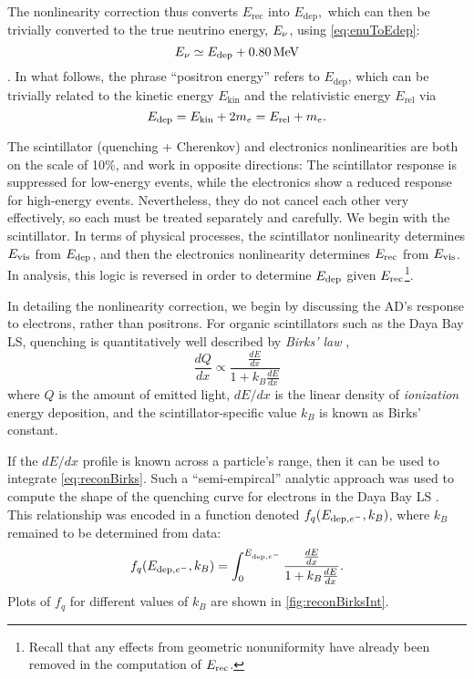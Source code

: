 \documentclass[../thesis.tex]{subfiles}
\begin{document}
The nonlinearity correction thus converts $E_{\mathrm{rec}}$ into $E_{\mathrm{dep}},$ which can then be trivially converted to the true neutrino energy, $E_\mathrm{\nu}$, using \autoref{eq:enuToEdep}:
\begin{equation}
  E_\mathrm{\nu} \simeq E_\mathrm{dep} + \SI{0.80}{MeV} 
\end{equation}.
In what follows, the phrase ``positron energy'' refers to $E_{\mathrm{dep}}$, which can be trivially related to the kinetic energy $E_{\mathrm{kin}}$ and the relativistic energy $E_{\mathrm{rel}}$ via
\begin{equation}
  E_\mathrm{dep} = E_{\mathrm{kin}} + 2m_e = E_{\mathrm{rel}} + m_e.
\end{equation}

The scintillator (quenching + Cherenkov)  and electronics nonlinearities are both on the scale of 10\%, and work in opposite directions: The scintillator response is suppressed for low-energy events, while the electronics show a reduced response for high-energy events. Nevertheless, they do not cancel each other very effectively, so each must be treated separately and carefully. We begin with the scintillator. In terms of physical processes, the scintillator nonlinearity determines $E_\mathrm{vis}$ from $E_\mathrm{dep}$, and then the electronics nonlinearity determines $E_\mathrm{rec}$ from $E_\mathrm{vis}$. In analysis, this logic is reversed in order to determine $E_\mathrm{dep}$ given $E_\mathrm{rec}$\footnote{Recall that any effects from geometric nonuniformity have already been removed in the computation of $E_\mathrm{rec}$.}.

In detailing the nonlinearity correction, we begin by discussing the AD's response to electrons, rather than positrons. For organic scintillators such as the Daya Bay LS, quenching is quantitatively well described by \emph{Birks' law} \cite{Birks_1951},
\begin{equation}
  \frac{dQ}{dx} \propto \frac{\frac{dE}{dx}}{1 + k_B \frac{dE}{dx}}
  \label{eq:reconBirks}
\end{equation}
where $Q$ is the amount of emitted light, $dE/dx$ is the linear density of \emph{ionization} energy deposition, and the scintillator-specific value $k_B$ is known as Birks' constant.

If the $dE/dx$ profile is known across a particle's range, then it can be used to integrate \eqref{eq:reconBirks}. Such a ``semi-empircal'' analytic approach was used to compute the shape of the quenching curve for electrons in the Daya Bay LS \cite{NonlinearityPaper}. This relationship was encoded in a function denoted $f_q(E_{\mathrm{dep},e^-}, k_B)$, where $k_B$ remained to be determined from data:
\begin{equation}
  f_q(E_{\mathrm{dep},e^-},k_B) = \int_0^{E_{\mathrm{dep},e^-}} \frac{\frac{dE}{dx}}{1 + k_B \frac{dE}{dx}}.
  \label{eq:reconBirksInt}
\end{equation}
Plots of $f_q$ for different values of $k_B$ are shown in \autoref{fig:reconBirksInt}.
\end{document}
